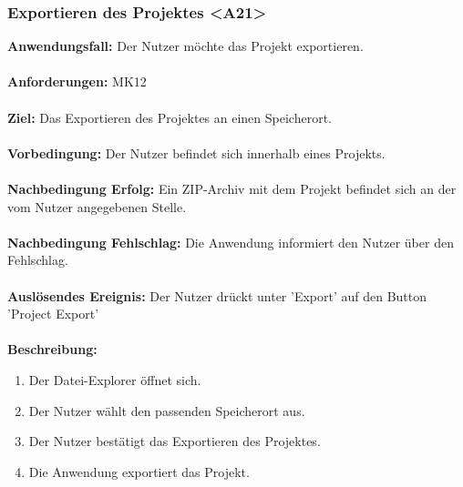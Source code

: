 \documentclass[parskip=full]{scrartcl} %
\begin{document}
\subsubsection*{Exportieren des Projektes <A21>}
\textbf{Anwendungsfall:} Der Nutzer möchte das Projekt exportieren. \\\\
\textbf{Anforderungen:} MK12\\\\
\textbf{Ziel:} Das Exportieren des Projektes an einen Speicherort.\\\\
\textbf{Vorbedingung:} Der Nutzer befindet sich innerhalb eines Projekts.\\\\
\textbf{Nachbedingung Erfolg:} Ein ZIP-Archiv mit dem Projekt befindet sich an der vom Nutzer angegebenen Stelle.\\\\
\textbf{Nachbedingung Fehlschlag:} Die Anwendung informiert den Nutzer über den Fehlschlag.\\\\
\textbf{Auslösendes Ereignis:}  Der Nutzer drückt unter 'Export' auf den Button 'Project Export' \\\\
\textbf{Beschreibung:}
\begin{enumerate}
    \item Der Datei-Explorer öffnet sich.
    \item Der Nutzer wählt den passenden Speicherort aus.
    \item Der Nutzer bestätigt das Exportieren des Projektes.
    \item Die Anwendung exportiert das Projekt.
\end{enumerate}
\newpage
\end{document}
